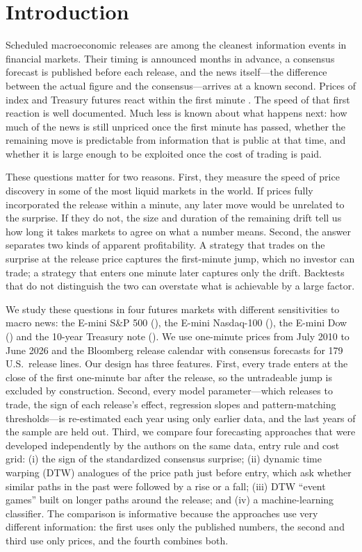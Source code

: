 \section{Introduction}\label{sec:intro}

Scheduled macroeconomic releases are among the cleanest information events in financial
markets. Their timing is announced months in advance, a consensus forecast is published before
each release, and the news itself---the difference between the actual figure and the
consensus---arrives at a known second. Prices of index and Treasury futures react within the first
minute \citep{Fleming1999, Balduzzi2001, Andersen2003, Andersen2007}. The speed of that first
reaction is well documented. Much less is known about what happens next: how much of the news is
still unpriced once the first minute has passed, whether the remaining move is predictable from
information that is public at that time, and whether it is large enough to be exploited once
the cost of trading is paid.

These questions matter for two reasons. First, they measure the speed of price discovery in some
of the most liquid markets in the world. If prices fully incorporated the release within a
minute, any later move would be unrelated to the surprise. If they do not, the size and duration
of the remaining drift tell us how long it takes markets to agree on what a number means. Second,
the answer separates two kinds of apparent profitability. A strategy that trades on the surprise
at the release price captures the first-minute jump, which no investor can trade; a strategy that
enters one minute later captures only the drift. Backtests that do not distinguish the two can
overstate what is achievable by a large factor.

We study these questions in four futures markets with different sensitivities to macro
news: the E-mini S\&P 500 (\ES), the E-mini Nasdaq-100 (\NQ), the E-mini Dow (\YM) and the 10-year
Treasury note (\ZN).
We use one-minute prices from July 2010 to June 2026 and the Bloomberg release calendar with
consensus forecasts for 179 U.S.\ release lines. Our design has three features. First, every
trade enters at the close of the first one-minute bar after the release, so the untradeable jump
is excluded by construction. Second, every model parameter---which releases to trade, the sign of
each release's effect, regression slopes and pattern-matching thresholds---is re-estimated each
year using only earlier data, and the last years of the sample are held out. Third, we compare
four forecasting approaches that were developed independently by the authors on the same data,
entry rule and cost grid: (i) the sign of the standardized consensus surprise; (ii) dynamic time
warping (DTW) analogues of the price path just before entry, which ask whether similar paths in
the past were followed by a rise or a fall; (iii) DTW ``event games'' built on longer paths around
the release; and (iv) a machine-learning classifier. The comparison is informative because the
approaches use very different information: the first uses only the published numbers, the second
and third use only prices, and the fourth combines both.

